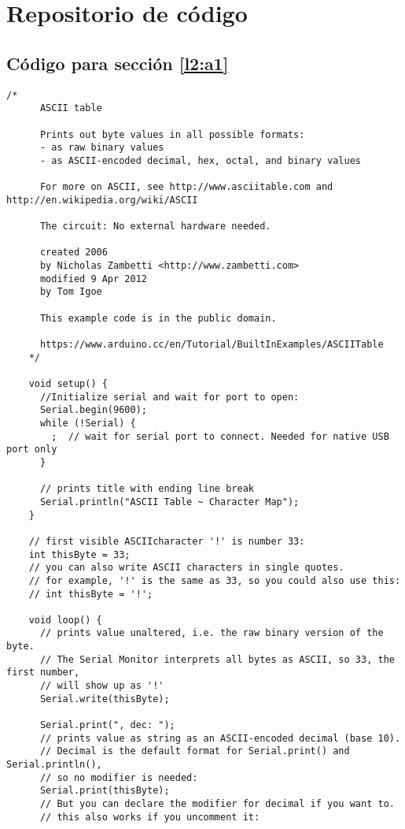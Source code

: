 \chapter{Repositorio de código}
\label{ap:osc}
\section{Código para sección \ref{l2:a1}}
\label{ApendiceA}

{\scriptsize 
    \begin{lstlisting}[language=Arduino,numbers=none, showstringspaces=false]
    /*
      ASCII table
    
      Prints out byte values in all possible formats:
      - as raw binary values
      - as ASCII-encoded decimal, hex, octal, and binary values
    
      For more on ASCII, see http://www.asciitable.com and http://en.wikipedia.org/wiki/ASCII
    
      The circuit: No external hardware needed.
    
      created 2006
      by Nicholas Zambetti <http://www.zambetti.com>
      modified 9 Apr 2012
      by Tom Igoe
    
      This example code is in the public domain.
    
      https://www.arduino.cc/en/Tutorial/BuiltInExamples/ASCIITable
    */
    
    void setup() {
      //Initialize serial and wait for port to open:
      Serial.begin(9600);
      while (!Serial) {
        ;  // wait for serial port to connect. Needed for native USB port only
      }
    
      // prints title with ending line break
      Serial.println("ASCII Table ~ Character Map");
    }
    
    // first visible ASCIIcharacter '!' is number 33:
    int thisByte = 33;
    // you can also write ASCII characters in single quotes.
    // for example, '!' is the same as 33, so you could also use this:
    // int thisByte = '!';
    
    void loop() {
      // prints value unaltered, i.e. the raw binary version of the byte.
      // The Serial Monitor interprets all bytes as ASCII, so 33, the first number,
      // will show up as '!'
      Serial.write(thisByte);
    
      Serial.print(", dec: ");
      // prints value as string as an ASCII-encoded decimal (base 10).
      // Decimal is the default format for Serial.print() and Serial.println(),
      // so no modifier is needed:
      Serial.print(thisByte);
      // But you can declare the modifier for decimal if you want to.
      // this also works if you uncomment it:
    

\end{lstlisting}}
